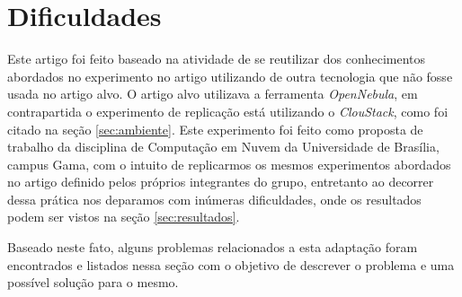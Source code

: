 \section{Dificuldades}   


  Este artigo foi feito baseado na atividade de se reutilizar dos conhecimentos abordados no experimento no artigo \cite{coutinho_et_al:14} utilizando de outra tecnologia que não fosse usada no artigo alvo. O artigo alvo utilizava a ferramenta \textit{OpenNebula}, em contrapartida o experimento de replicação está utilizando o \textit{ClouStack}, como foi citado na seção \ref{sec:ambiente}. Este experimento foi feito como proposta de trabalho da disciplina de Computação em Nuvem da Universidade de Brasília, campus Gama, com o intuito de replicarmos os mesmos experimentos abordados no artigo definido pelos próprios integrantes do grupo, entretanto ao decorrer dessa prática nos deparamos com inúmeras dificuldades, onde os resultados podem ser vistos na seção \ref{sec:resultados}.

  Baseado neste fato, alguns problemas relacionados a esta adaptação foram encontrados e listados nessa seção com o objetivo de descrever o problema e uma possível solução para o mesmo.

